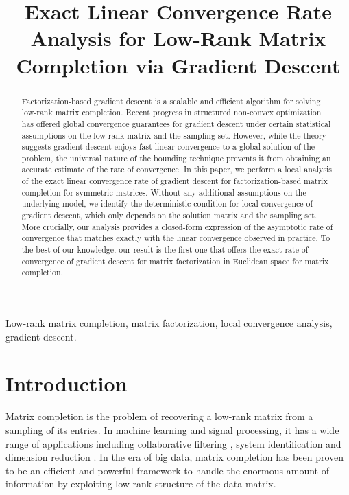 \documentclass{article}
\title{Exact Linear Convergence Rate Analysis for Low-Rank \hlnew{Symmetric} Matrix Completion via Gradient Descent}
\newcommand{\hlnew}[1]{{#1}}
\begin{document}
\ninept
%
\maketitle
%
\begin{abstract}
Factorization-based gradient descent is a scalable and efficient algorithm for solving low-rank matrix completion. Recent progress in structured non-convex optimization has offered global convergence guarantees for gradient descent under certain statistical assumptions on the low-rank matrix and the sampling set. However, while the theory suggests gradient descent enjoys fast linear convergence to a global solution of the problem, the universal nature of the bounding technique prevents it from obtaining an accurate estimate of the rate of convergence. In this paper, we perform a local analysis of the exact linear convergence rate of gradient descent for factorization-based matrix completion for symmetric matrices. Without any additional assumptions on the underlying model, we identify the deterministic condition for local convergence of gradient descent, which only depends on the solution matrix and the sampling set. More crucially, our analysis provides a closed-form expression of the asymptotic rate of convergence that matches exactly with the linear convergence observed in practice. To the best of our knowledge, our result is the first one that offers the exact rate of convergence of gradient descent for matrix factorization in Euclidean space for matrix completion.
\end{abstract}
%
\begin{keywords}
Low-rank matrix completion, matrix factorization, local convergence analysis, \hlnew{gradient descent}.
\end{keywords}
%




\section{Introduction}
\label{sec:intro}

Matrix completion is the problem of recovering a low-rank matrix from a sampling of its entries. In machine learning and signal processing, it has a wide range of applications including collaborative filtering \cite{rennie2005fast}, system identification \cite{liu2009interior} and dimension reduction \cite{candes2011robust}. In the era of big data, matrix completion has been proven to be an efficient and powerful framework to handle the enormous amount of information by exploiting low-rank structure of the data matrix. 
\end{document}
